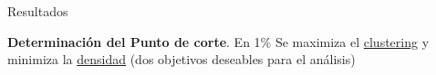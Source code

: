 \documentclass[compress]{beamer}
\begin{document}
\begin{frame}
\centering
\Large Resultados
\end{frame}

\begin{frame}

\scriptsize{
\textbf{Determinación del Punto de corte}. En 1\% Se maximiza el \underline{clustering} y minimiza la \underline{densidad} (dos objetivos deseables para el análisis)}

	\begin{figure}
		\centering

\end{figure}
\end{frame}
\end{document}
